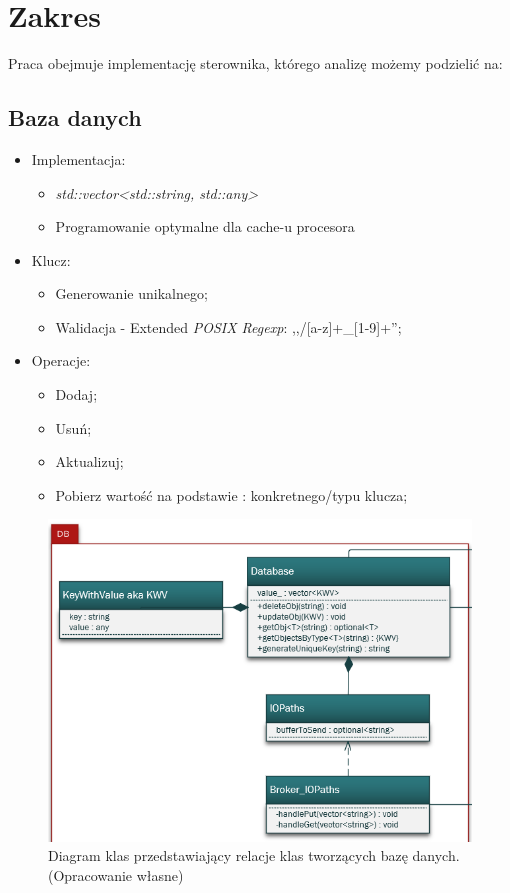 \section{Zakres}
	Praca obejmuje implementację sterownika, którego analizę możemy podzielić na:

	\subsection{Baza danych}
	\begin{itemize}
		\item Implementacja:
		\begin{itemize}
			\item \textit{std::vector<std::string, std::any>}
			\item Programowanie optymalne dla cache-u procesora
		\end{itemize}
		\item Klucz:
		\begin{itemize}
			\item Generowanie unikalnego;
			\item Walidacja - Extended \textit{POSIX Regexp}: ,,/[a-z]+\_[1-9]+'';
		\end{itemize}
		\item Operacje:
		\begin{itemize}
			\item Dodaj;
			\item Usuń;
			\item Aktualizuj;
			\item Pobierz wartość na podstawie : konkretnego/typu klucza;
		\end{itemize}
	\end{itemize}
    \begin{figure}[h!]
        \centering
        \includegraphics[scale=0.90]{Obrazki/DiagramyKlas/DB.png}
        \caption{Diagram klas przedstawiający relacje klas tworzących bazę danych.
            \newline(Opracowanie własne)}
    \end{figure}

